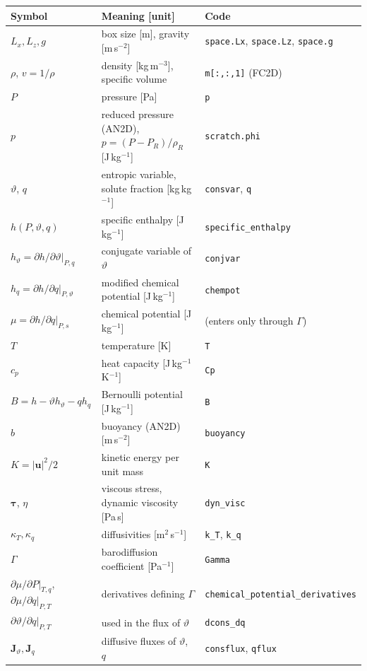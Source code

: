 \documentclass[11pt,a4paper]{article}
\newcommand{\vt}{\vartheta}                    %
\newcommand{\bu}{\mathbf{u}}
\newcommand{\bJ}{\mathbf{J}}
\newcommand{\btau}{\boldsymbol{\tau}}
\newcommand{\code}[1]{\texttt{#1}}
\begin{document}
\begin{table}[ht]
\centering\small
\begin{tabular}{p{4.3cm}p{6.0cm}p{4.9cm}}
\hline
Symbol & Meaning [unit] & Code \\ \hline
$L_x,L_z,g$ & box size [m], gravity [m\,s$^{-2}$] & \code{space.Lx}, \code{space.Lz}, \code{space.g} \\
$\rho$, $v=1/\rho$ & density [kg\,m$^{-3}$], specific volume & \code{m[:,:,1]} (FC2D) \\
$P$ & pressure [Pa] & \code{p} \\
$p$ & reduced pressure (AN2D), $p=(P-P_R)/\rho_R$ [J\,kg$^{-1}$] & \code{scratch.phi} \\
$\vt$, $q$ & entropic variable, solute fraction [kg\,kg$^{-1}$] & \code{consvar}, \code{q} \\
$h(P,\vt,q)$ & specific enthalpy [J\,kg$^{-1}$] & \code{specific\_enthalpy} \\
$h_\vt=\partial h/\partial\vt|_{P,q}$ & conjugate variable of $\vt$ & \code{conjvar} \\
$h_q=\partial h/\partial q|_{P,\vt}$ & modified chemical potential [J\,kg$^{-1}$] & \code{chempot} \\
$\mu=\partial h/\partial q|_{P,s}$ & chemical potential [J\,kg$^{-1}$] & (enters only through $\Gamma$) \\
$T$ & temperature [K] & \code{T} \\
$c_p$ & heat capacity [J\,kg$^{-1}$K$^{-1}$] & \code{Cp} \\
$B=h-\vt h_\vt-q h_q$ & Bernoulli potential [J\,kg$^{-1}$] & \code{B} \\
$b$ & buoyancy (AN2D) [m\,s$^{-2}$] & \code{buoyancy} \\
$K=|\bu|^2/2$ & kinetic energy per unit mass & \code{K} \\
$\btau$, $\eta$ & viscous stress, dynamic viscosity [Pa\,s] & \code{dyn\_visc} \\
$\kappa_T,\kappa_q$ & diffusivities [m$^2$\,s$^{-1}$] & \code{k\_T}, \code{k\_q} \\
$\Gamma$ & barodiffusion coefficient [Pa$^{-1}$] & \code{Gamma} \\
$\partial\mu/\partial P|_{T,q}$, $\partial\mu/\partial q|_{P,T}$ & derivatives defining $\Gamma$ & \code{chemical\_potential\_derivatives} \\
$\partial\vt/\partial q|_{P,T}$ & used in the flux of $\vt$ & \code{dcons\_dq} \\
$\bJ_\vt,\bJ_q$ & diffusive fluxes of $\vt$, $q$ & \code{consflux}, \code{qflux} \\

\end{tabular}
\end{table}
\end{document}
